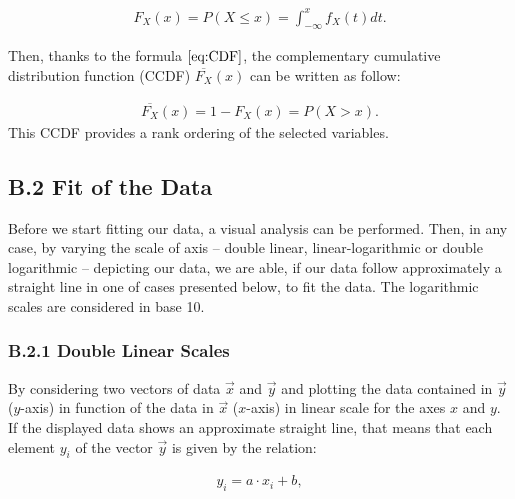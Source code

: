 \documentclass[unnumsec,webpdf,contemporary,large]{oup-authoring-template}%
\theoremstyle{thmstyleone}%
\theoremstyle{thmstyletwo}%
\theoremstyle{thmstylethree}%
\begin{document}
\begin{appendices}
    \begin{align}
    F_X(x) = P(X \leq x) = \int_{-\infty}^x f_X(t) dt.
    \label{eq:CDF}
    \end{align}
     
     Then, thanks to the formula $\eqref{eq:CDF}$, the complementary cumulative distribution function (CCDF) $\overline{F_X}(x)$ can be written as follow:
     
    \begin{align}
    \overline{F_X}(x) = 1 - F_X(x) = P(X > x).
    \end{align}
    \noindent
    This CCDF provides a rank ordering of the selected variables.\\
    
    
    \subsection{B.2 Fit of the Data}
    
    Before we start fitting our data, a visual analysis can be performed. Then, in any case, by varying the scale of axis -- double linear, linear-logarithmic or double logarithmic -- depicting our data, we are able, if our data follow approximately a straight line in one of cases presented below, to fit the data. The logarithmic scales are considered in base 10.\\
     
    \subsubsection{B.2.1 Double Linear Scales}
    \label{subsub:lin-lin}
    
    By considering two vectors of data $\overrightarrow{x}$ and $\overrightarrow{y}$ and plotting the data contained in $\overrightarrow{y}$ ($y$-axis) in function of the data in $\overrightarrow{x}$ ($x$-axis) in linear scale for the axes $x$ and $y$. If the displayed data shows an approximate straight line, that means that each element $y_i$ of the vector $\overrightarrow{y}$ is given by the relation:
    
    \begin{align}
    y_i = a \cdot x_i + b,
    \label{eq:lin-lin}
    \end{align}
    

\end{appendices}
\end{document}
